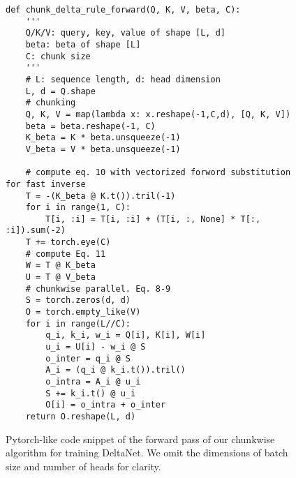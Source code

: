 

\begin{figure}[h]
\centering
\begin{lstlisting}
def chunk_delta_rule_forward(Q, K, V, beta, C):
    '''
    Q/K/V: query, key, value of shape [L, d]
    beta: beta of shape [L]
    C: chunk size 
    '''
    # L: sequence length, d: head dimension 
    L, d = Q.shape
    # chunking
    Q, K, V = map(lambda x: x.reshape(-1,C,d), [Q, K, V])
    beta = beta.reshape(-1, C)
    K_beta = K * beta.unsqueeze(-1)
    V_beta = V * beta.unsqueeze(-1)
    
    # compute eq. 10 with vectorized forword substitution for fast inverse
    T = -(K_beta @ K.t()).tril(-1)
    for i in range(1, C):
        T[i, :i] = T[i, :i] + (T[i, :, None] * T[:, :i]).sum(-2)
    T += torch.eye(C)
    # compute Eq. 11
    W = T @ K_beta
    U = T @ V_beta
    # chunkwise parallel. Eq. 8-9
    S = torch.zeros(d, d)
    O = torch.empty_like(V)
    for i in range(L//C):
        q_i, k_i, w_i = Q[i], K[i], W[i]
        u_i = U[i] - w_i @ S
        o_inter = q_i @ S
        A_i = (q_i @ k_i.t()).tril()
        o_intra = A_i @ u_i
        S += k_i.t() @ u_i
        O[i] = o_intra + o_inter
    return O.reshape(L, d)
\end{lstlisting}
\caption{Pytorch-like code snippet of the forward pass of our chunkwise algorithm for training DeltaNet. We omit the dimensions of batch size and number of heads for clarity.}
\label{list_code}
\end{figure}